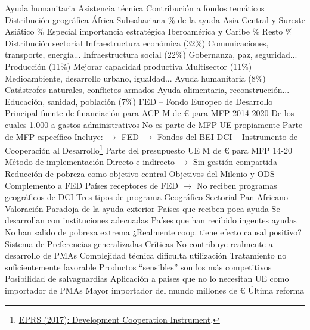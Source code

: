 \documentclass{nuevotema}
\begin{document}
\begin{esquemal}
				\4 Ayuda humanitaria
				\4 Asistencia técnica
				\4 Contribución a fondos temáticos
			\3 Distribución geográfica
				\4 África Subsahariana
				\% de la ayuda
				\4 Asia Central y Sureste Asiático
				\%
				\4[] Especial importancia estratégica
				\4 Iberoamérica y Caribe
				\%
				\4 Resto
				\%
			\3 Distribución sectorial
				\4 Infraestructura económica (32\%)
				\4[] Comunicaciones, transporte, energía...
				\4 Infraestructura social (22\%)
				\4[] Gobernanza, paz, seguridad...
				\4 Producción (11\%)
				\4[] Mejorar capacidad productiva
				\4 Multisector (11\%)
				\4[] Medioambiente, desarrollo urbano, igualdad...
				\4 Ayuda humanitaria (8\%)
				\4[] Catástrofes naturales, conflictos armados
				\4[] Ayuda alimentaria, reconstrucción...
				\4 Educación, sanidad, población (7\%)
			\3 FED -- Fondo Europeo de Desarrollo
				\4 Principal fuente de financiación para ACP
				 M de € para MFP 2014-2020
				\4[] De los cuales 1.000 a gastos administrativos
				\4 No es parte de MFP UE propiamente
				\4 Parte de MFP específico
				\4[] Incluye:
				\4[] $\to$ FED
				\4[] $\to$ Fondos del BEI
			\3 DCI -- Instrumento de Cooperación al Desarrollo\footnote{\href{https://www.europarl.europa.eu/RegData/etudes/BRIE/2017/608764/EPRS_BRI(2017)608764_EN.pdf}{EPRS (2017): Development Cooperation Instrument}.}
				\4 Parte del presupuesto UE
				 M de € para MFP 14-20
				\4 Método de implementación
				\4[] Directo e indirecto
				\4[] $\to$ Sin gestión compartida
				\4 Reducción de pobreza como objetivo central
				\4 Objetivos del Milenio y ODS
				\4 Complemento a FED
				\4[] Países receptores de FED
				\4[] $\to$ No reciben programas geográficos de DCI
				\4 Tres tipos de programa
				\4[] Geográfico
				\4[] Sectorial
				\4[] Pan-Africano
		\2 Valoración
			\3 Paradoja de la ayuda exterior
				\4 Países que reciben poca ayuda
				\4[] Se desarrollan con instituciones adecuadas
				\4 Países que han recibido ingentes ayudas
				\4[] No han salido de pobreza extrema
				\4[$\then$] ¿Realmente coop. tiene efecto causal positivo?
			\3 Sistema de Preferencias generalizadas
				\4 Críticas
				\4[] No contribuye realmente a desarrollo de PMAs
				\4[] Complejidad técnica dificulta utilización
				\4[] Tratamiento no suficientemente favorable
				\4[] Productos ``sensibles'' son los más competitivos
				\4[] Posibilidad de salvaguardias
				\4[] Aplicación a países que no lo necesitan
				\4 UE como importador de PMAs
				\4[] Mayor importador del mundo
				 millones de €
				\4 Última reforma

\end{esquemal}
\end{document}
